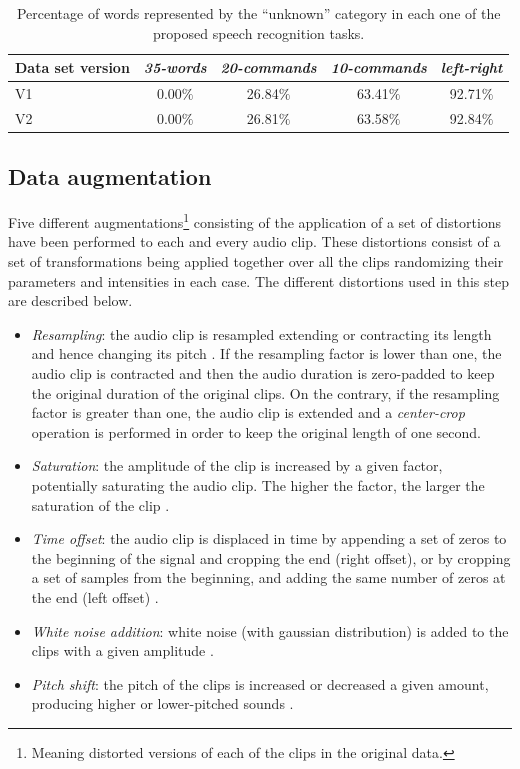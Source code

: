 \begin{table}[ht]
	\centering
	\caption[Percentage of ``unknown'' speech commands in each task]{Percentage of words represented by the ``unknown'' category in each one of the proposed speech recognition tasks. }
	\label{tab:unknowns}
	\begin{tabular}{lcccc}
		\hline
		Data set version & \textit{35-words} & \textit{20-commands} & \textit{10-commands} & \textit{left-right}  \\
		\hline
		V1 	& 0.00$\%$  &  26.84$\%$  &	  63.41$\%$  &	92.71$\%$ \\
		V2 	& 0.00$\%$  &	26.81$\%$  &  63.58$\%$  &	92.84$\%$ \\
		\bottomrule
	\end{tabular}
\end{table}


\subsection{Data augmentation}
Five different augmentations\footnote{Meaning distorted versions of each of the clips in the original data.} consisting of the application of a set of distortions have been performed to each and every audio clip. These distortions consist of a set of transformations being applied together over all the clips randomizing their parameters and intensities in each case. The different distortions used in this step are described below.

\begin{itemize}
	\item \textit{Resampling}: the audio clip is resampled extending or contracting its length and hence changing its pitch \autocite{Proakis2007}. If the resampling factor is lower than one, the audio clip is contracted and then the audio duration is zero-padded to keep the original duration of the original clips. On the contrary, if the resampling factor is greater than one, the audio clip is extended and a \textit{center-crop} operation is performed in order to keep the original length of one second.
	\item \textit{Saturation}: the amplitude of the clip is increased by a given factor, potentially saturating the audio clip. The higher the factor, the larger the saturation of the clip \autocite{Proakis2007}.
	\item \textit{Time offset}: the audio clip is displaced in time by appending a set of zeros to the beginning of the signal and cropping the end (right offset), or by cropping a set of samples from the beginning, and adding the same number of zeros at the end (left offset) \autocite{Proakis2007}.
	\item \textit{White noise addition}: white noise (with gaussian distribution) is added to the clips with a given amplitude \autocite{Proakis2007}.
	\item \textit{Pitch shift}: the pitch of the clips is increased or decreased a given amount, producing higher or lower-pitched sounds \autocite{Proakis2007, Szymon2016}.
\end{itemize}

